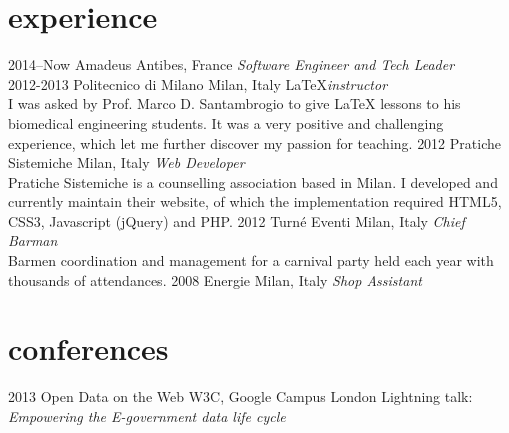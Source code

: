 \documentclass[]{friggeri-cv} %
\begin{document}

\section{experience}

\begin{entrylist}
\entry
{2014--Now}
{Amadeus}
{Antibes, France}
{\emph{Software Engineer and Tech Leader} \\
}
\entry
{2012-2013}
{Politecnico di Milano}
{Milan, Italy}
{\LaTeX \emph{instructor} \\
I was asked by Prof. Marco D. Santambrogio to give \LaTeX{} lessons to his biomedical engineering students.
It was a very positive and challenging experience, which let me further discover my passion for teaching.
}
\entry
{2012}
{Pratiche Sistemiche}
{Milan, Italy}
{\emph{Web Developer} \\
Pratiche Sistemiche is a counselling association based in Milan. I developed and currently
  maintain their website, of which the implementation required HTML5, CSS3, Javascript (jQuery)
  and PHP.
}
\entry
{2012}
{Turné Eventi}
{Milan, Italy}
{\emph{Chief Barman} \\
Barmen coordination and management for a carnival party held each year with thousands of attendances.
}
\entry
{2008}
{Energie}
{Milan, Italy}
{\emph{Shop Assistant}}
\end{entrylist}


\section{conferences}

\begin{entrylist}
\entry
{2013}
{Open Data on the Web}
{W3C, Google Campus London}
{Lightning talk: \emph{Empowering the E-government data life cycle}}
\end{entrylist}
\end{document}
